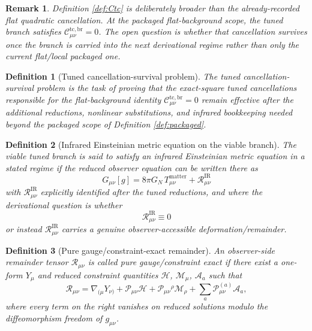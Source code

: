 \documentclass[11pt]{article}
\newtheorem{definition}{Definition}
\newtheorem{remark}{Remark}
\begin{document}
\begin{remark}
Definition \ref{def:Ctc} is deliberately broader than the already-recorded flat quadratic cancellation. At the packaged flat-background scope, the tuned branch satisfies \(\mathcal C_{\mu\nu}^{\mathrm{tc,br}}=0\). The open question is whether that cancellation survives once the branch is carried into the next derivational regime rather than only the current flat/local packaged one.
\end{remark}

\begin{definition}[Tuned cancellation-survival problem]
\label{def:survival}
The \emph{tuned cancellation-survival problem} is the task of proving that the exact-square tuned cancellations responsible for the flat-background identity \(\mathcal C_{\mu\nu}^{\mathrm{tc,br}}=0\) remain effective after the additional reductions, nonlinear substitutions, and infrared bookkeeping needed beyond the packaged scope of Definition \ref{def:packaged}.
\end{definition}

\begin{definition}[Infrared Einsteinian metric equation on the viable branch]
\label{def:infrared}
The viable tuned branch is said to satisfy an \emph{infrared Einsteinian metric equation} in a stated regime if the reduced observer equation can be written there as
\begin{equation}
G_{\mu\nu}[g]
=
8\pi G_N\,T_{\mu\nu}^{\mathrm{matter}}
+ \mathcal R_{\mu\nu}^{\mathrm{IR}}
\label{eq:infraredeq}
\end{equation}
with \(\mathcal R_{\mu\nu}^{\mathrm{IR}}\) explicitly identified after the tuned reductions, and where the derivational question is whether
\begin{equation}
\mathcal R_{\mu\nu}^{\mathrm{IR}}\equiv 0
\label{eq:irzero}
\end{equation}
or instead \(\mathcal R_{\mu\nu}^{\mathrm{IR}}\) carries a genuine observer-accessible deformation/remainder.
\end{definition}

\begin{definition}[Pure gauge/constraint-exact remainder]
\label{def:pure}
An observer-side remainder tensor \(\mathcal R_{\mu\nu}\) is called \emph{pure gauge/constraint exact} if there exist a one-form \(Y_\mu\) and reduced constraint quantities \(\mathcal H\), \(\mathcal M_\mu\), \(\mathcal A_a\) such that
\begin{equation}
\mathcal R_{\mu\nu}
=
\nabla_{(\mu}Y_{\nu)}
+ \mathcal P_{\mu\nu}\mathcal H
+ \mathcal P_{\mu\nu}{}^\rho\mathcal M_\rho
+ \sum_a \mathcal P_{\mu\nu}^{(a)}\mathcal A_a,
\label{eq:pure}
\end{equation}
where every term on the right vanishes on reduced solutions modulo the diffeomorphism freedom of \(g_{\mu\nu}\).
\end{definition}
\end{document}
